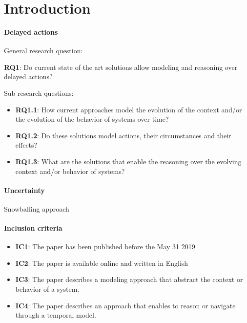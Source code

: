 \section{Introduction}

\paragraph{Delayed actions}
General research question:
\begin{center}
	\textbf{RQ1}: Do current state of the art solutions allow modeling and reasoning over delayed actions?  
\end{center}

Sub research questions:
\begin{itemize}
	\item \textbf{RQ1.1}: How current approaches model the evolution of the context and/or the evolution of the behavior of systems over time?
	\item \textbf{RQ1.2}: Do these solutions model actions, their circumstances and their effects?
	\item \textbf{RQ1.3}: What are the solutions that enable the reasoning over the evolving context and/or behavior of systems?
\end{itemize}


\paragraph{Uncertainty}

Snowballing approach~\cite{DBLP:conf/ease/Wohlin14}

\paragraph{Inclusion criteria}
\begin{itemize}
	\item \textbf{IC1}: The paper has been published before the May 31 2019
	\item \textbf{IC2}: The paper is available online and written in English
	\item \textbf{IC3}: The paper describes a modeling approach that abstract the context or behavior of a system.
	\item \textbf{IC4}: The paper describes an approach that enables to reason or navigate through a temporal model.
\end{itemize}

